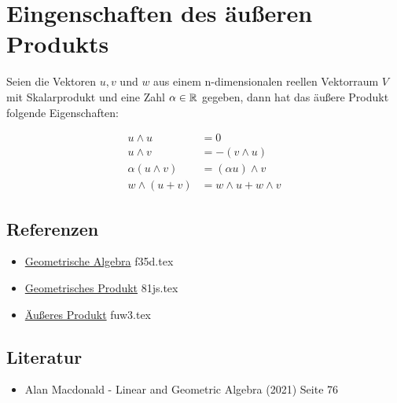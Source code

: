 \documentclass{sajzk}
\begin{document}
\section{Eingenschaften des äußeren Produkts}
\label{vc8d}

Seien die Vektoren $u, v$ und $w$ aus einem n-dimensionalen reellen Vektorraum
$V$ mit Skalarprodukt und eine Zahl $\alpha \in \mathbb{R}$ gegeben, dann  hat das
äußere Produkt folgende Eigenschaften:

\begin{align*}
    u \wedge u &= 0 \\
    u \wedge v &= -(v \wedge u) \\
    \alpha(u \wedge v) &= (\alpha u)\wedge v \\
    w \wedge (u + v) &= w \wedge u + w \wedge v
\end{align*}

\subsection{Referenzen}
\begin{itemize}
    \item \href{f35d.pdf}{Geometrische Algebra} f35d.tex
    \item \href{81js.pdf}{Geometrisches Produkt} 81js.tex
    \item \href{fuw3.pdf}{Äußeres Produkt} fuw3.tex
\end{itemize}

\subsection{Literatur}
\begin{itemize}
    \item Alan Macdonald - Linear and Geometric Algebra (2021) Seite 76
\end{itemize}
\end{document}
